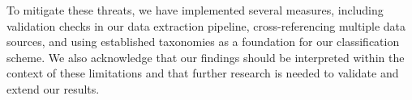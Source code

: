 To mitigate these threats, we have implemented several measures, including validation checks in our data extraction pipeline, cross-referencing multiple data sources, and using established taxonomies as a foundation for our classification scheme. We also acknowledge that our findings should be interpreted within the context of these limitations and that further research is needed to validate and extend our results.
